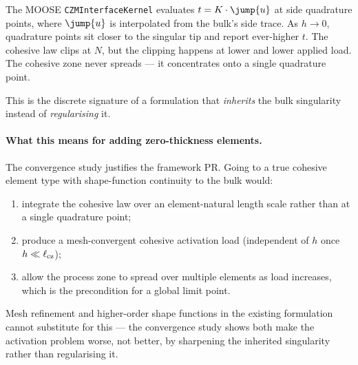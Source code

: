 The MOOSE \texttt{CZMInterfaceKernel} evaluates $t = K \cdot \jump{u}$ at
side quadrature points, where $\jump{u}$ is interpolated from the bulk's
side trace. As $h \to 0$, quadrature points sit closer to the singular
tip and report ever-higher $t$. The cohesive law clips at $N$, but the
clipping happens at lower and lower applied load. The cohesive zone
never spreads — it concentrates onto a single quadrature point.

This is the discrete signature of a formulation that \emph{inherits} the
bulk singularity instead of \emph{regularising} it.

\paragraph{What this means for adding zero-thickness elements.}
The convergence study justifies the framework PR. Going to a true
cohesive element type with shape-function continuity to the bulk would:
\begin{enumerate}
\item integrate the cohesive law over an element-natural length scale
      rather than at a single quadrature point;
\item produce a mesh-convergent cohesive activation load (independent of
      $h$ once $h \ll \ell_{\rm cz}$);
\item allow the process zone to spread over multiple elements as load
      increases, which is the precondition for a global limit point.
\end{enumerate}
Mesh refinement and higher-order shape functions in the existing
formulation cannot substitute for this — the convergence study shows
both make the activation problem worse, not better, by sharpening the
inherited singularity rather than regularising it.

